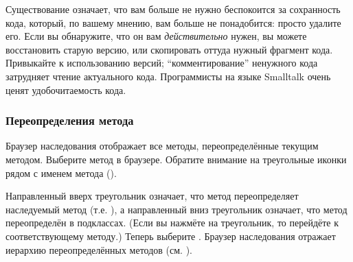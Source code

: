 \documentclass[a4paper,10pt,twoside]{book}
\begin{document}
Существование  означает, что вам больше не нужно беспокоится за сохранность кода, который, по вашему мнению, вам больше не понадобится: просто удалите его. Если вы обнаружите, что он вам \emph{действительно} нужен, вы можете восстановить старую версию, или скопировать оттуда нужный фрагмент кода. Привыкайте к использованию версий; ``комментирование'' ненужного кода затрудняет чтение актуального кода. Программисты на языке Smalltalk очень ценят удобочитаемость кода.



\subsubsection{Переопределения метода}


Браузер наследования отображает все методы, переопределённые текущим методом. Выберите метод в браузере. Обратите внимание на треугольные иконки рядом с именем метода ().


Направленный вверх треугольник означает, что метод  переопределяет наследуемый метод (т.е. ), а направленный вниз треугольник означает, что метод переопределён в подклассах. (Если вы нажмёте на треугольник, то перейдёте к соответствующему методу.) Теперь выберите . Браузер наследования отражает иерархию переопределённых методов (см. ).
\end{document}
